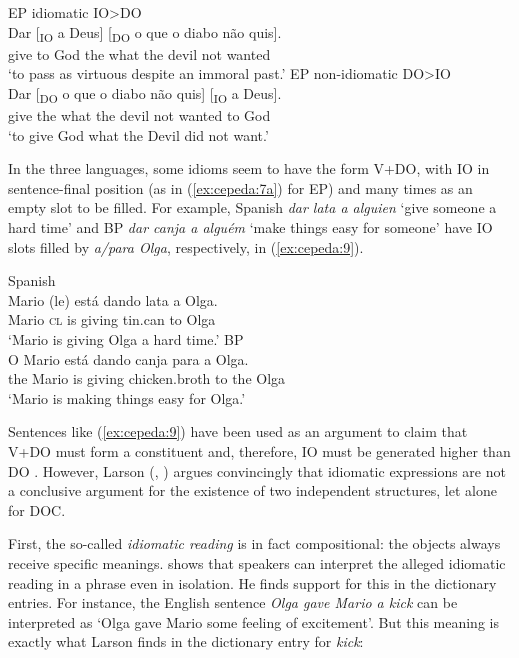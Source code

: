 \documentclass[output=paper,colorlinks,citecolor=brown,nonflat]{./langscibook}
\begin{document}
\ea%
    \label{ex:cepeda:8}
	\ea\label{ex:cepeda:8a}
	EP idiomatic IO>DO\\
	\gll Dar [\textsubscript{IO} a  Deus] [\textsubscript{DO} o que o diabo não quis].\\
		give \hspaceThis{[\textsubscript{IO}} to God \hspaceThis{[\textsubscript{DO}} the what the devil  not  wanted\\
	\glt ‘to pass as virtuous despite an immoral past.’
	\ex\label{ex:cepeda:8b}
	EP non-idiomatic DO>IO\\
	\gll Dar [\textsubscript{DO} o que o diabo não quis] [\textsubscript{IO} a  Deus]. \\
		give \hspaceThis{[\textsubscript{DO}} the what the devil  not  wanted \hspaceThis{[\textsubscript{IO}} to God\\
	\glt ‘to give God what the Devil did not want.’
	\z
\z

In the three languages, some idioms seem to have the form V+DO, with IO in sentence-final position (as in (\ref{ex:cepeda:7a}) for EP) and many times as an empty slot to be filled. For example, Spanish \textit{dar lata a alguien} ‘give someone a hard time’ and BP \textit{dar canja a alguém} ‘make things easy for someone’ have IO slots filled by \textit{a/para Olga}, respectively, in (\ref{ex:cepeda:9}).

\ea%
    \label{ex:cepeda:9}
	\ea\label{ex:cepeda:9a}
	Spanish\\
	\gll Mario (le) está dando lata a  Olga.\\
		Mario \textsc{cl} is giving tin.can to Olga\\
	\glt ‘Mario is giving Olga a hard time.’
	\ex\label{ex:cepeda:9b}
	BP\\
	\gll O Mario está dando canja para a Olga.\\
		the Mario is    giving chicken.broth  to   the Olga\\
	\glt ‘Mario is making things easy for Olga.’
	\z
\z

Sentences like (\ref{ex:cepeda:9}) have been used as an argument to claim that V+DO must form a constituent and, therefore, IO must be generated higher than DO \citep{Bleam2003}. However, Larson (\citeyear{Larson2014}, \citeyear{Larson2017}) argues convincingly that idiomatic expressions are not a conclusive argument for the existence of two independent structures, let alone for DOC.

First, the so-called \textit{idiomatic reading} is in fact compositional: the objects always receive specific meanings. \citet{Larson2017} shows that speakers can interpret the alleged idiomatic reading in a phrase even in isolation. He finds support for this in the dictionary entries. For instance, the English sentence \textit{Olga gave Mario a kick} can be interpreted as ‘Olga gave Mario some feeling of excitement’. But this meaning is exactly what Larson finds in the dictionary entry for \textit{kick}:
\end{document}
